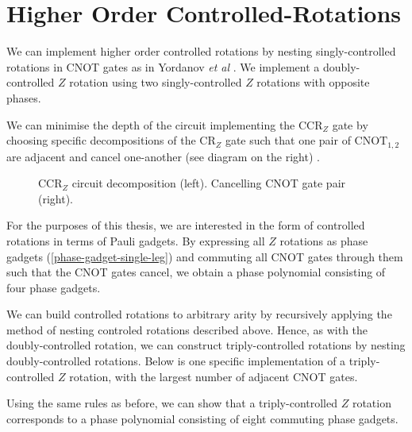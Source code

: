 \section{Higher Order Controlled-Rotations}

We can implement higher order controlled rotations by nesting singly-controlled rotations in CNOT gates as in Yordanov \textit{et al} \cite{Yordanov2020}. We implement a doubly-controlled $Z$ rotation using two singly-controlled $Z$ rotations with opposite phases.


We can minimise the depth of the circuit implementing the CCR$_Z$ gate by choosing specific decompositions of the CR$_Z$ gate such that one pair of $\text{CNOT}_{1, 2}$ are adjacent and cancel one-another (see diagram on the right) \cite{Yordanov2020}.

\begin{figure}[H]
    \centering
    \caption{CCR$_Z$ circuit decomposition (left). Cancelling CNOT gate pair (right).}
\end{figure}

For the purposes of this thesis, we are interested in the form of controlled rotations in terms of Pauli gadgets. By expressing all $Z$ rotations as phase gadgets (\ref{phase-gadget-single-leg}) and commuting all CNOT gates through them such that the CNOT gates cancel, we obtain a phase polynomial consisting of four phase gadgets.


We can build controlled rotations to arbitrary arity by recursively applying the method of nesting controled rotations described above. Hence, as with the doubly-controlled rotation, we can construct triply-controlled rotations by nesting doubly-controlled rotations. Below is one specific implementation of a triply-controlled $Z$ rotation, with the largest number of adjacent CNOT gates.


Using the same rules as before, we can show that a triply-controlled $Z$ rotation corresponds to a phase polynomial consisting of eight commuting phase gadgets.


